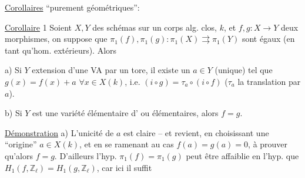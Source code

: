 \uline{Corollaires} ``purement géométriques'':

\uline{Corollaire} 1 Soient $X,Y$ des schémas  sur un corps alg. clos, $k$, et $f,g:X\longrightarrow Y$ deux morphismes, on suppose que $\pi_1(f),\pi_1(g):\pi_1(X)\rightrightarrows\pi_1(Y)$ sont égaux (en tant qu'hom. extérieurs). Alors

a) Si $Y$   extension d'une VA par un tore, il existe un $a\in Y$ (unique) tel que $g(x)=f(x)+a$ $\forall x\in X(k)$, i.e. $(i\circ g)=\tau_a\circ(i\circ f)$ ($\tau_a$ la translation par $a$).

b) Si $Y$ est une variété élémentaire d' ou    élémentaires,  alors $f=g$.


\uline{Démonstration} a) L'unicité de $a$ est claire -- et   revient,  en choisissant une ``origine'' $a\in X(k)$, et en se ramenant au cas $f(a)=g(a)=0$, à prouver qu'alors $f=g$. D'ailleurs l'hyp. $\pi_1(f)=\pi_1(g)$ peut être affaiblie en l'hyp. que  $H_1(f,\mathbb Z_\ell)=H_1(g,\mathbb Z_\ell)$,  car ici il suffit
